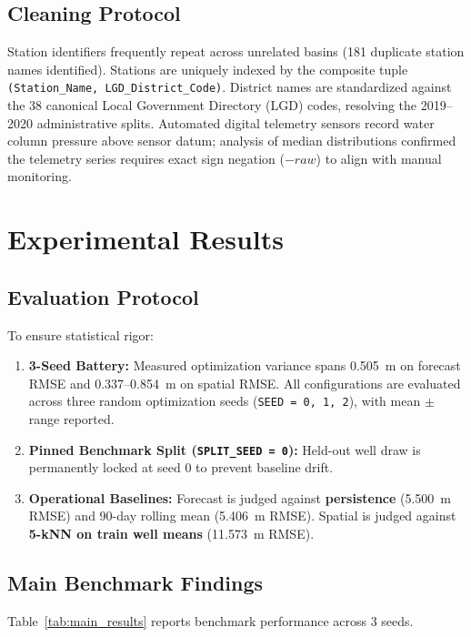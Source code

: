 \documentclass[10pt,conference,letterpaper]{IEEEtran}
\begin{document}
\subsection{Cleaning Protocol}
Station identifiers frequently repeat across unrelated basins (181 duplicate station names identified). Stations are uniquely indexed by the composite tuple \texttt{(Station\_Name, LGD\_District\_Code)}. District names are standardized against the 38 canonical Local Government Directory (LGD) codes, resolving the 2019--2020 administrative splits. Automated digital telemetry sensors record water column pressure above sensor datum; analysis of median distributions confirmed the telemetry series requires exact sign negation ($-raw$) to align with manual monitoring.

\section{Experimental Results}

\subsection{Evaluation Protocol}
To ensure statistical rigor:
\begin{enumerate}
    \item \textbf{3-Seed Battery:} Measured optimization variance spans 0.505~m on forecast RMSE and 0.337--0.854~m on spatial RMSE. All configurations are evaluated across three random optimization seeds (\texttt{SEED = 0, 1, 2}), with mean $\pm$ range reported.
    \item \textbf{Pinned Benchmark Split (\texttt{SPLIT\_SEED = 0}):} Held-out well draw is permanently locked at seed 0 to prevent baseline drift.
    \item \textbf{Operational Baselines:} Forecast is judged against \textbf{persistence} (5.500~m RMSE) and 90-day rolling mean (5.406~m RMSE). Spatial is judged against \textbf{5-kNN on train well means} (11.573~m RMSE).
\end{enumerate}

\subsection{Main Benchmark Findings}
Table~\ref{tab:main_results} reports benchmark performance across 3 seeds.
\end{document}
